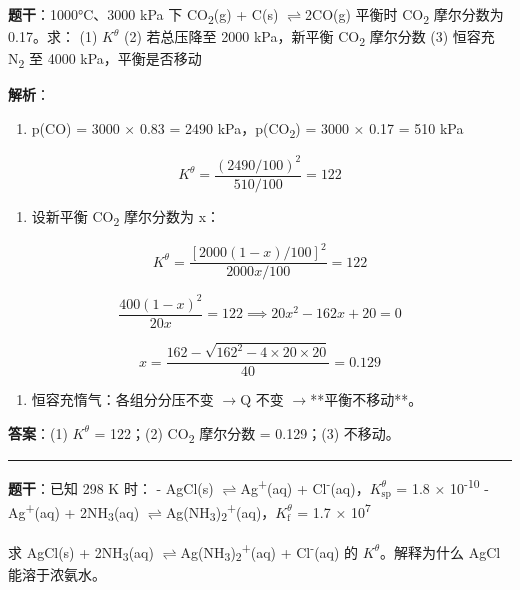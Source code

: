 \documentclass[a4paper,11pt]{ctexart}
\providecommand{\tightlist}{\setlength{\itemsep}{0pt}\setlength{\parskip}{0pt}}
\newcommand{\箭}{\ensuremath{\rightarrow}}
\newcommand{\左箭}{\ensuremath{\leftarrow}}
\newcommand{\上箭}{\ensuremath{\uparrow}}
\newcommand{\下箭}{\ensuremath{\downarrow}}
\newcommand{\衡}{\ensuremath{\rightleftharpoons}}
\newcommand{\双箭}{\ensuremath{\leftrightarrow}}
\newcommand{\约等于}{\ensuremath{\approx}}
\newcommand{\小于等于}{\ensuremath{\leq}}
\newcommand{\大于等于}{\ensuremath{\geq}}
\newcommand{\不等于}{\ensuremath{\neq}}
\newcommand{\西格马}{\ensuremath{\sigma}}
\newcommand{\派}{\ensuremath{\pi}}
\begin{document}
\textbf{题干}：1000°C、3000 kPa 下 CO\textsubscript{2}(g) + C(s) \衡 2CO(g) 平衡时 CO\textsubscript{2} 摩尔分数为 0.17。求：
(1) \(K^\theta\)
(2) 若总压降至 2000 kPa，新平衡 CO\textsubscript{2} 摩尔分数
(3) 恒容充 N\textsubscript{2} 至 4000 kPa，平衡是否移动

\textbf{解析}：

\begin{enumerate}
\def\labelenumi{(\arabic{enumi})}
\tightlist
\item
  p(CO) = 3000 × 0.83 = 2490 kPa，p(CO\textsubscript{2}) = 3000 × 0.17 = 510 kPa
\end{enumerate}

\[K^\theta = \frac{(2490/100)^2}{510/100} = 122\]

\begin{enumerate}
\def\labelenumi{(\arabic{enumi})}
\setcounter{enumi}{1}
\tightlist
\item
  设新平衡 CO\textsubscript{2} 摩尔分数为 x：
\end{enumerate}

\[K^\theta = \frac{[2000(1-x)/100]^2}{2000x/100} = 122\]

\[\frac{400(1-x)^2}{20x} = 122 \implies 20x^2 - 162x + 20 = 0\]

\[x = \frac{162 - \sqrt{162^2 - 4 \times 20 \times 20}}{40} = 0.129\]

\begin{enumerate}
\def\labelenumi{(\arabic{enumi})}
\setcounter{enumi}{2}
\tightlist
\item
  恒容充惰气：各组分分压不变 \箭 Q 不变 \箭 **平衡不移动**。
\end{enumerate}

\textbf{答案}：(1) \(K^\theta\) = 122；(2) CO\textsubscript{2} 摩尔分数 = 0.129；(3) 不移动。

\begin{center}\rule{0.5\linewidth}{0.5pt}\end{center}

\textbf{题干}：已知 298 K 时：
- AgCl(s) \衡 Ag\textsuperscript{+}(aq) + Cl\textsuperscript{-}(aq)，\(K_{\mathrm{sp}}^\theta\) = 1.8 × 10\textsuperscript{-10}
- Ag\textsuperscript{+}(aq) + 2NH\textsubscript{3}(aq) \衡 Ag(NH\textsubscript{3})\textsubscript{2}\textsuperscript{+}(aq)，\(K_{\mathrm f}^\theta\) = 1.7 × 10\textsuperscript{7}

求 AgCl(s) + 2NH\textsubscript{3}(aq) \衡 Ag(NH\textsubscript{3})\textsubscript{2}\textsuperscript{+}(aq) + Cl\textsuperscript{-}(aq) 的 \(K^\theta\)。解释为什么 AgCl 能溶于浓氨水。
\end{document}
